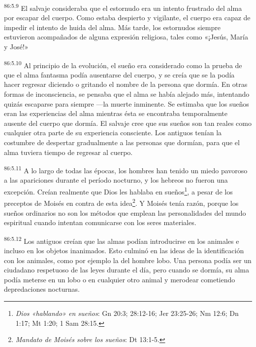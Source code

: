 \par
\textsuperscript{86:5.9} El salvaje consideraba que el estornudo era un intento frustrado del alma por escapar del cuerpo. Como estaba despierto y vigilante, el cuerpo era capaz de impedir el intento de huida del alma. Más tarde, los estornudos siempre estuvieron acompañados de alguna expresión religiosa, tales como «¡Jesús, María y José!»

\par
\textsuperscript{86:5.10} Al principio de la evolución, el sueño era considerado como la prueba de que el alma fantasma podía ausentarse del cuerpo, y se creía que se la podía hacer regresar diciendo o gritando el nombre de la persona que dormía. En otras formas de inconsciencia, se pensaba que el alma se había alejado más, intentando quizás escaparse para siempre ---la muerte inminente. Se estimaba que los sueños eran las experiencias del alma mientras ésta se encontraba temporalmente ausente del cuerpo que dormía. El salvaje cree que sus sueños son tan reales como cualquier otra parte de su experiencia consciente. Los antiguos tenían la costumbre de despertar gradualmente a las personas que dormían, para que el alma tuviera tiempo de regresar al cuerpo.

\par
\textsuperscript{86:5.11} A lo largo de todas las épocas, los hombres han tenido un miedo pavoroso a las apariciones durante el período nocturno, y los hebreos no fueron una excepción. Creían realmente que Dios les hablaba en sueños\footnote{\textit{Dios «hablando» en sueños}: Gn 20:3; 28:12-16; Jer 23:25-26; Nm 12:6; Dn 1:17; Mt 1:20; 1 Sam 28:15.}, a pesar de los preceptos de Moisés en contra de esta idea\footnote{\textit{Mandato de Moisés sobre los sueños}: Dt 13:1-5.}. Y Moisés tenía razón, porque los sueños ordinarios no son los métodos que emplean las personalidades del mundo espiritual cuando intentan comunicarse con los seres materiales.

\par
\textsuperscript{86:5.12} Los antiguos creían que las almas podían introducirse en los animales e incluso en los objetos inanimados. Esto culminó en las ideas de la identificación con los animales, como por ejemplo la del hombre lobo. Una persona podía ser un ciudadano respetuoso de las leyes durante el día, pero cuando se dormía, su alma podía meterse en un lobo o en cualquier otro animal y merodear cometiendo depredaciones nocturnas.

